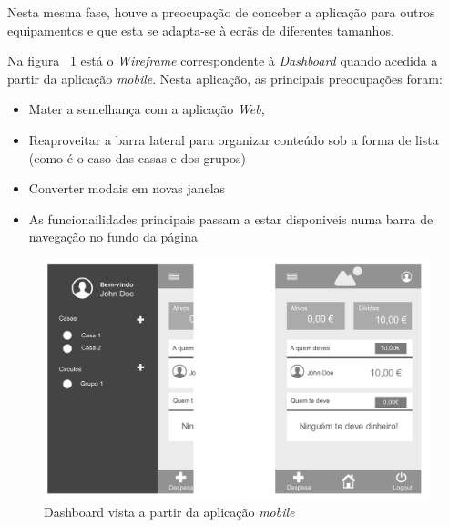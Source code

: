Nesta mesma fase, houve a preocupação de conceber a aplicação para outros equipamentos e que esta se adapta-se à ecrãs de diferentes tamanhos.

Na figura ~\ref{fig:mockup_mobile} está o \emph{Wireframe} correspondente à \emph{Dashboard} quando acedida a partir da aplicação \emph{mobile}. Nesta aplicação, as principais preocupações foram:

\begin{itemize}
	\item Mater a semelhança com a aplicação \emph{Web},
	\item Reaproveitar a barra lateral para organizar conteúdo sob a forma de lista (como é o caso das casas e dos grupos)
	\item Converter modais em novas janelas
	\item As funcionailidades principais passam a estar disponiveis numa barra de navegação no fundo da página
\end{itemize}

\begin{figure}[ht]
\centering
\includegraphics[width=.9\textwidth]{images/mobilemockup}
\caption{Dashboard vista a partir da aplicação \emph{mobile}}
\label{fig:mockup_mobile}
\end{figure}


